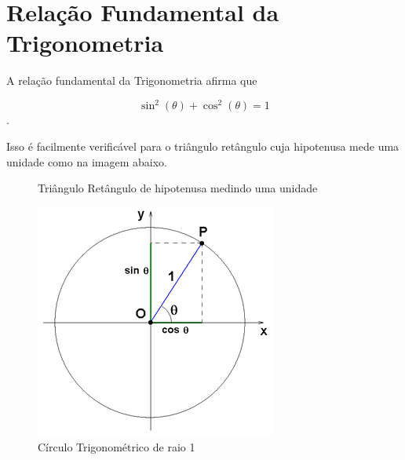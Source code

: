 \section{Relação Fundamental da Trigonometria}

A relação fundamental da Trigonometria afirma que

\begin{equation}
    \sin^2 (\theta)+\cos^2 (\theta)=1
\end{equation}.

Isso é facilmente verificável para o triângulo retângulo cuja hipotenusa mede uma unidade como na imagem abaixo.

\begin{figure}[h]
    \centering
{}
    \caption{Triângulo Retângulo de hipotenusa medindo uma unidade}
    \label{fig:my_label}
\end{figure}



\begin{figure}[h]
    \centering
    \includegraphics[scale=0.6]{./imagens/11.png}
    \caption{Círculo Trigonométrico de raio 1}
    \label{fig:my_label}
\end{figure}

